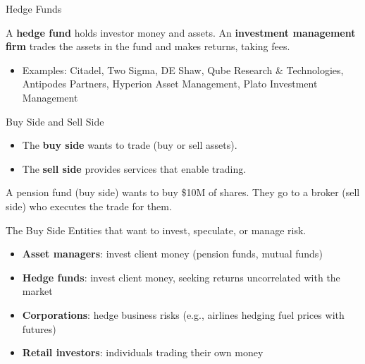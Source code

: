 \begin{frame}{Hedge Funds}
  \begin{sqt:definition}
    A \textbf{hedge fund} holds investor money and assets.
    An \textbf{investment management firm} trades the assets in the fund and makes returns,
    taking fees.
  \end{sqt:definition}

  \begin{itemize}
    \item Examples: Citadel, Two Sigma, DE Shaw, Qube Research \& Technologies, Antipodes Partners,
    Hyperion Asset Management, Plato Investment Management
  \end{itemize}
\end{frame}

\begin{frame}{Buy Side and Sell Side}
  \begin{sqt:definition}
    \begin{itemize}
      \item The \textbf{buy side} wants to trade (buy or sell assets).
      \item The \textbf{sell side} provides services that enable trading.
    \end{itemize}
  \end{sqt:definition}

  \vspace{0.3cm}
  \begin{sqt:tip}
    A pension fund (buy side) wants to buy \$10M of shares.
    They go to a broker (sell side) who executes the trade for them.
  \end{sqt:tip}
\end{frame}

\begin{frame}{The Buy Side}
  Entities that want to invest, speculate, or manage risk.

  \vspace{0.3cm}
  \begin{itemize}
    \item \textbf{Asset managers}: invest client money (pension funds, mutual funds)
    \item \textbf{Hedge funds}: invest client money, seeking returns uncorrelated with the market
    \item \textbf{Corporations}: hedge business risks (e.g., airlines hedging fuel prices with futures)
    \item \textbf{Retail investors}: individuals trading their own money
  \end{itemize}
\end{frame}

